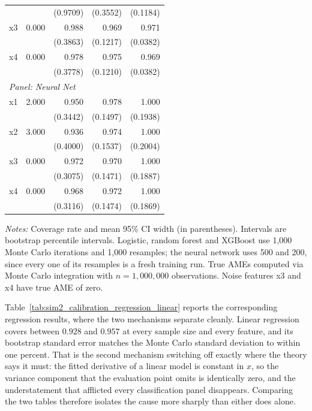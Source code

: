 \documentclass[12pt,a4paper]{article}
\numberwithin{equation}{section}
\theoremstyle{plain}
\theoremstyle{definition}
\begin{document}
\begin{table}[htbp]
\begin{threeparttable}
\begin{tabular}{lrrrr}
				&  & (0.9709) & (0.3552) & (0.1184) \\
				\quad x3 & 0.000 & 0.988 & 0.969 & 0.971 \\
				&  & (0.3863) & (0.1217) & (0.0382) \\
				\quad x4 & 0.000 & 0.978 & 0.975 & 0.969 \\
				&  & (0.3778) & (0.1210) & (0.0382) \\
				\midrule
				\multicolumn{5}{l}{\textit{Panel: Neural Net}} \\
				\quad x1 & 2.000 & 0.950 & 0.978 & 1.000 \\
				&  & (0.3442) & (0.1497) & (0.1938) \\
				\quad x2 & 3.000 & 0.936 & 0.974 & 1.000 \\
				&  & (0.4000) & (0.1537) & (0.2004) \\
				\quad x3 & 0.000 & 0.972 & 0.970 & 1.000 \\
				&  & (0.3075) & (0.1471) & (0.1887) \\
				\quad x4 & 0.000 & 0.968 & 0.972 & 1.000 \\
				&  & (0.3116) & (0.1474) & (0.1869) \\
				\bottomrule
				\end{tabular}
				\begin{tablenotes}
				\footnotesize
				\item \textit{Notes:} Coverage rate and mean 95\% CI width (in parentheses). Intervals are bootstrap percentile intervals. Logistic, random forest and XGBoost use 1{,}000 Monte Carlo iterations and 1{,}000 resamples; the neural network uses 500 and 200, since every one of its resamples is a fresh training run. True AMEs computed via Monte Carlo integration with $n=1{,}000{,}000$ observations. Noise features x3 and x4 have true AME of zero.
				\end{tablenotes}
		\end{threeparttable}
	\end{table}
	
	Table~\ref{tab:sim2_calibration_regression_linear} reports the corresponding regression results, where the two mechanisms separate cleanly. Linear regression covers between $0.928$ and $0.957$ at every sample size and every feature, and its bootstrap standard error matches the Monte Carlo standard deviation to within one percent. That is the second mechanism switching off exactly where the theory says it must: the fitted derivative of a linear model is constant in $x$, so the variance component that the evaluation point omits is identically zero, and the understatement that afflicted every classification panel disappears. Comparing the two tables therefore isolates the cause more sharply than either does alone.
	
\end{document}
